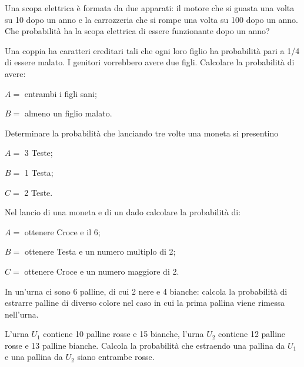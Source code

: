 \begin{esercizio}[\Ast]
 \label{ese:9.54}
Una scopa elettrica è formata da due apparati: il motore che si guasta una volta su 10 dopo un anno e la carrozzeria che si rompe una volta su 100 dopo un anno. Che probabilità ha la scopa elettrica di essere funzionante dopo un anno?
\end{esercizio}

\begin{esercizio}[\Ast]
 \label{ese:9.55}
Una coppia ha caratteri ereditari tali che ogni loro figlio ha probabilità pari a 1/4 di essere malato. I genitori vorrebbero avere due figli. Calcolare la probabilità di avere:
\begin{itemize*}
\item $ A= $ entrambi i figli sani;
\item $ B= $ almeno un figlio malato.
\end{itemize*}
\end{esercizio}

\begin{esercizio}[\Ast]
 \label{ese:9.56}
Determinare la probabilità che lanciando tre volte una moneta si presentino
\begin{itemize*}
\item $ A= $ 3 Teste;
\item $ B= $ 1 Testa;
\item $ C= $ 2 Teste.
\end{itemize*}
\end{esercizio}

\begin{esercizio}[\Ast]
 \label{ese:9.57}
Nel lancio di una moneta e di un dado calcolare la probabilità di:
\begin{itemize*}
\item $ A= $ ottenere Croce e il 6;
\item $ B= $ ottenere Testa e un numero multiplo di 2;
\item $ C= $ ottenere Croce e un numero maggiore di 2.
\end{itemize*}
\end{esercizio}

\begin{esercizio}[\Ast]
 \label{ese:9.58}
In un'urna ci sono 6 palline, di cui 2 nere e 4 bianche: calcola la probabilità di estrarre palline di diverso colore nel caso in cui la prima pallina viene rimessa nell'urna.
\end{esercizio}

\begin{esercizio}
 \label{ese:9.59}
L'urna $ U_1 $ contiene 10 palline rosse e 15 bianche, l'urna $ U_2 $ contiene 12 palline rosse e 13 palline bianche. Calcola la probabilità che estraendo una pallina da $ U_1 $ e una pallina da $ U_2 $ siano entrambe rosse.
\end{esercizio}

